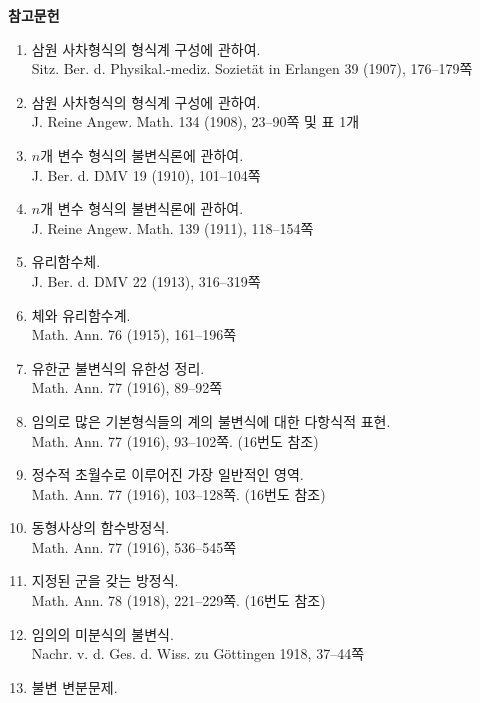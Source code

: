 
\clearpage
\begin{center}
{\Large\bfseries 참고문헌}
\end{center}

\begin{enumerate}
\setlength{\itemsep}{0.35em}
\item 삼원 사차형식의 형식계 구성에 관하여.\\
Sitz. Ber. d. Physikal.-mediz. Sozietät in Erlangen 39 (1907), 176--179쪽
\item 삼원 사차형식의 형식계 구성에 관하여.\\
J. Reine Angew. Math. 134 (1908), 23--90쪽 및 표 1개
\item \(n\)개 변수 형식의 불변식론에 관하여.\\
J. Ber. d. DMV 19 (1910), 101--104쪽
\item \(n\)개 변수 형식의 불변식론에 관하여.\\
J. Reine Angew. Math. 139 (1911), 118--154쪽
\item 유리함수체.\\
J. Ber. d. DMV 22 (1913), 316--319쪽
\item 체와 유리함수계.\\
Math. Ann. 76 (1915), 161--196쪽
\item 유한군 불변식의 유한성 정리.\\
Math. Ann. 77 (1916), 89--92쪽
\item 임의로 많은 기본형식들의 계의 불변식에 대한 다항식적 표현.\\
Math. Ann. 77 (1916), 93--102쪽. (16번도 참조)
\item 정수적 초월수로 이루어진 가장 일반적인 영역.\\
Math. Ann. 77 (1916), 103--128쪽. (16번도 참조)
\item 동형사상의 함수방정식.\\
Math. Ann. 77 (1916), 536--545쪽
\item 지정된 군을 갖는 방정식.\\
Math. Ann. 78 (1918), 221--229쪽. (16번도 참조)
\item 임의의 미분식의 불변식.\\
Nachr. v. d. Ges. d. Wiss. zu Göttingen 1918, 37--44쪽
\item 불변 변분문제.\\

\end{enumerate}
